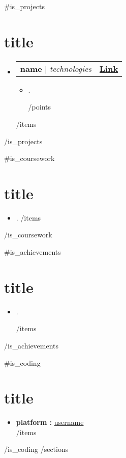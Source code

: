 \documentclass[letterpaper,11pt]{article}
\makeatletter
\newcommand{\resumeItem}[1]{
  \item\small{
    {#1 \vspace{-2pt}}
  }
}
\newcommand{\resumeProjectHeading}[2]{
    \item
    \begin{tabular*}{1.001\textwidth}{l@{\extracolsep{\fill}}r}
      \small#1 & \textbf{\small #2}\\
    \end{tabular*}\vspace{-7pt}
}
\newcommand{\resumeSubHeadingListStart}{\begin{itemize}[leftmargin=0.0in, label={}]}
\newcommand{\resumeSubHeadingListEnd}{\end{itemize}}
\newcommand{\resumeItemListStart}{\begin{itemize}}
\newcommand{\resumeItemListEnd}{\end{itemize}\vspace{-5pt}}
\makeatother
\begin{document}
{{#is_projects}}
\section{ {{{title}}} }
\vspace{-5pt}
    \resumeSubHeadingListStart
      {{#items}}
      \resumeProjectHeading
          {\textbf{ {{{name}}} } $|$ \emph{ {{{technologies}}} } }{ {\href{ {{{link}}} }{Link}} }
          \resumeItemListStart
            {{#points}}
            \resumeItem{ {{{.}}} }
            {{/points}}
            \vspace{-12pt}
          \resumeItemListEnd
      {{/items}}
    \resumeSubHeadingListEnd
\vspace{-5pt}
{{/is_projects}}

{{#is_coursework}}
\section{ {{{title}}} }
    \begin{multicols}{4}
        \begin{itemize}[itemsep=-5pt, parsep=4pt]
            {{#items}}
            \item\small {{{.}}}
            {{/items}}
            
        \end{itemize}
    \end{multicols}
    \vspace*{2.0\multicolsep}
{{/is_coursework}}

{{#is_achievements}}
\section{ {{{title}}} }
    \resumeItemListStart
        {{#items}}
        \resumeItem{ {{{.}}} }
        \vspace{-2pt}
        {{/items}}
    \resumeItemListEnd
{{/is_achievements}}

{{#is_coding}}
\section{\textbf{ {{{title}}} }}
\vspace{1mm}
\begin{multicols}{3}
    \begin{itemize}[itemsep=-5pt, parsep=3pt]
        {{#items}}
        \item\small \textbf{ {{{platform}}} :}  \href{ {{{url}}} }{ {{{username}}} } \\
        {{/items}}
    \end{itemize}
\end{multicols}
\vspace*{2.0\multicolsep}
{{/is_coding}}
{{/sections}}
\end{document}
